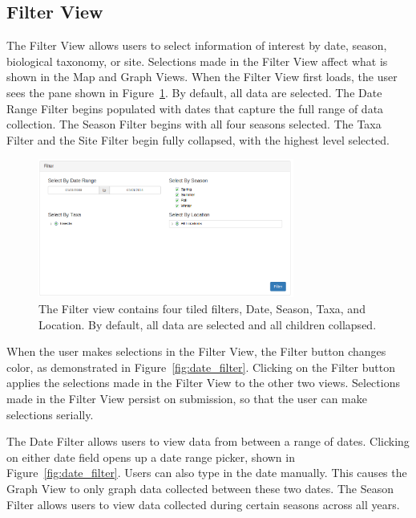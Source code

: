 \documentclass[10pt,draftclsnofoot,onecolumn]{IEEEtran}
\begin{document}
\subsection{Filter View} %

The Filter View allows users to select information of interest by date, season, biological taxonomy, or site.
Selections made in the Filter View affect what is shown in the Map and Graph Views.
When the Filter View first loads, the user sees the pane shown in Figure~\ref{fig:overall_filter}.
By default, all data are selected.
The Date Range Filter begins populated with dates that capture the full range of data collection.
The Season Filter begins with all four seasons selected.
The Taxa Filter and the Site Filter begin fully collapsed, with the highest level selected.

\begin{figure}[h]
\centering
\includegraphics[width=0.75\textwidth]{images/overall_filter.png}
\captionsetup{justification=centering}
\caption{
  The Filter view contains four tiled filters, Date, Season, Taxa, and Location.
  By default, all data are selected and all children collapsed.
}
\label{fig:overall_filter}
\end{figure}

When the user makes selections in the Filter View, the Filter button changes color, as demonstrated in Figure~\ref{fig:date_filter}.
Clicking on the Filter button applies the selections made in the Filter View to the other two views.
Selections made in the Filter View persist on submission, so that the user can make selections serially.

The Date Filter allows users to view data from between a range of dates.
Clicking on either date field opens up a date range picker, shown in Figure~\ref{fig:date_filter}.
Users can also type in the date manually.
This causes the Graph View to only graph data collected between these two dates.
The Season Filter allows users to view data collected during certain seasons across all years.
\end{document}
